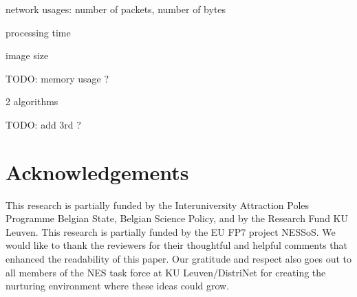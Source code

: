 \documentclass[conference]{IEEEtran}
\begin{document}
network usages: number of packets, number of bytes

processing time

image size

TODO: memory usage ?

2 algorithms \cite{ganeriwal2008reputation}

TODO: add 3rd ? \cite{krontiris2009cooperative}


\section*{Acknowledgements}

This research is partially funded by the Interuniversity Attraction Poles
Programme Belgian State, Belgian Science Policy, and by the Research Fund KU
Leuven. This research is partially funded by the EU FP7 project NESSoS. We
would like to thank the reviewers for their thoughtful and helpful comments
that enhanced the readability of this paper. Our gratitude and respect also
goes out to all members of the NES task force at KU Leuven/DistriNet for
creating the nurturing environment where these ideas could grow.



\end{document}
